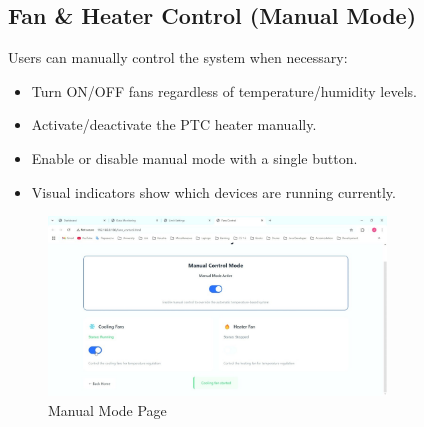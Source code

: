 \documentclass[a4paper]{scrartcl}
\begin{document}
\subsection{ Fan \& Heater Control (Manual Mode)}
Users can manually control the system when necessary:
\begin{itemize}
    \item Turn ON/OFF fans regardless of temperature/humidity levels.
    \item Activate/deactivate the PTC heater manually.
    \item Enable or disable manual mode with a single button.
    \item Visual indicators show which devices are running currently.
\end{itemize}
\begin{figure}[H]
    \centering
    \includegraphics[width=0.8\textwidth]{images/MCP.jpg}
    \caption{Manual Mode Page}
\end{figure}
\end{document}
